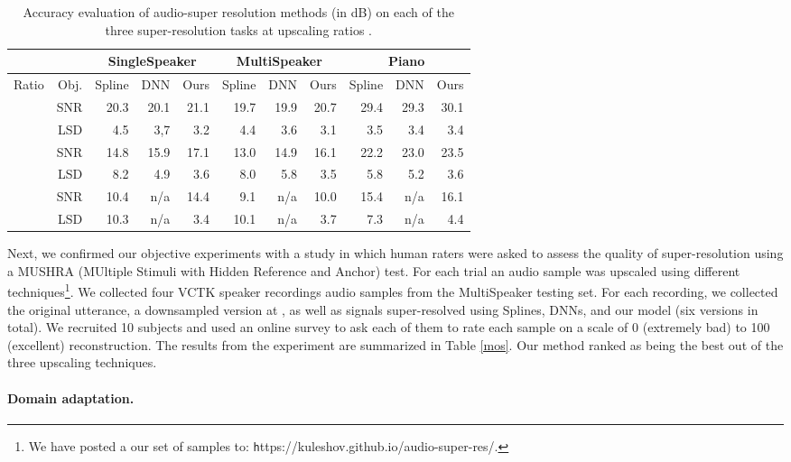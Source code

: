 \documentclass{article} \usepackage{iclr2017_workshop,times}
\begin{document}
\begin{table}[t]
\label{multispeaker}
\begin{center}
\begin{tabular}{lr|rrr|rrr|rrr}
& & \multicolumn{3}{c}{SingleSpeaker}  & \multicolumn{3}{c}{MultiSpeaker} & \multicolumn{3}{c}{Piano}                  \\
\hline
Ratio & Obj. & Spline & DNN & Ours  & Spline & DNN & Ours  & Spline & DNN & Ours \\
\hline
    & SNR & 20.3 & 20.1 & 21.1 & 19.7 & 19.9 & 20.7 & 29.4 & 29.3 & 30.1 \\
    & LSD & 4.5 & 3,7 & 3.2 & 4.4 & 3.6 & 3.1 & 3.5 & 3.4 & 3.4 \\
    & SNR & 14.8 & 15.9 & 17.1  & 13.0 & 14.9 & 16.1  & 22.2 & 23.0 & 23.5 \\
    & LSD & 8.2 & 4.9 & 3.6  & 8.0 & 5.8 & 3.5 & 5.8 & 5.2 & 3.6 \\
    & SNR & 10.4 & n/a & 14.4  & 9.1 & n/a & 10.0 & 15.4 & n/a & 16.1 \\
    & LSD & 10.3 & n/a & 3.4  & 10.1 & n/a & 3.7 & 7.3 & n/a & 4.4 \\
\end{tabular}
\end{center}
\caption{Accuracy evaluation of audio-super resolution methods (in dB) on each of the three super-resolution tasks at upscaling ratios .}
\end{table}


Next, we confirmed our objective experiments with a study in which human raters were asked to assess the quality of super-resolution using a MUSHRA (MUltiple Stimuli with Hidden Reference and Anchor) test. For each trial an audio sample was upscaled using different techniques\footnote{We have posted a our set of samples to: {\texttt https://kuleshov.github.io/audio-super-res/}.}. We collected four VCTK speaker recordings audio samples from the {\sc MultiSpeaker} testing set. For each recording, we collected the original utterance, a downsampled version at , as well as signals super-resolved using Splines, DNNs, and our model (six versions in total). We recruited 10 subjects and used an online survey to ask each of them to rate each sample on a scale of 0 (extremely bad) to 100 (excellent) reconstruction.
The results from the experiment are summarized in Table \ref{mos}.
Our method ranked as being the best out of the three upscaling techniques.

\paragraph{Domain adaptation.}
\end{document}
